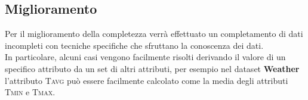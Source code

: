 \subsection{Miglioramento}

Per il miglioramento della completezza verrà effettuato un completamento di dati incompleti con tecniche specifiche che sfruttano la conoscenza dei dati.\\
In particolare, alcuni casi vengono facilmente risolti derivando il valore di un specifico attributo da un set di altri attributi, per esempio nel dataset \textbf{Weather} l'attributo \textsc{Tavg} può essere facilmente calcolato come la media degli attributi \textsc{Tmin} e \textsc{Tmax}.